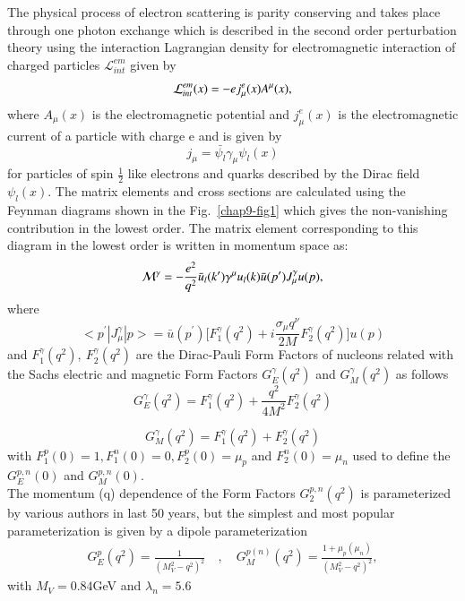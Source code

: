 The physical process of electron scattering is parity conserving and takes place through one photon exchange which is described in the second order perturbation theory using the interaction Lagrangian density for electromagnetic interaction  of charged particles $\mathcal{L}_{int}^{em}$  given by 
\begin{equation}
{\cal L}_{int}^{em}(x) = -e j_{\mu}^{e}(x)A^{\mu}(x),\label{chap9-eq1}
\end{equation}
where $A_\mu(x)$ is the electromagnetic potential and $j_\mu^e(x)$ is the electromagnetic current of a particle with charge e and is given by 
\begin{equation}
j_\mu =\bar{\psi_l}\gamma_\mu \psi_l(x) \label{chap9-eq2}
\end{equation}
for particles of spin $\frac{1}{2}$ like electrons and quarks described by the Dirac field $\psi_{l}(x)$. The matrix elements and cross sections are calculated using the Feynman diagrams shown in the Fig.~\ref{chap9-fig1} which gives the non-vanishing contribution in the lowest order. The matrix element corresponding to this diagram in the lowest order is written in momentum
space as:
\begin{equation}
{\cal M}^{\gamma} = -\frac{e^2}{q^2}\bar{u}_l(k')\gamma^\mu u_l(k) \bar{u}(p^\prime)J_\mu^\gamma u(p), \label{chap9-eq3}
\end{equation}
where 
\begin{equation}
<p^\prime|J_\mu^\gamma|p>= \bar{u}(p^\prime)\big[F_1^{\gamma}(q^2)+i\frac{\sigma_\mu q^\nu}{2M}F_2^{\gamma}(q^2)\big]u(p) \label{chap9-eq4} 
\end{equation}
and $F_1^\gamma(q^2),~ F_2^\gamma(q^2) $ are the Dirac-Pauli Form Factors of nucleons related with the Sachs electric and magnetic Form Factors $G_E^\gamma(q^2)$ and $G_M^\gamma(q^2)$  as follows
\begin{equation}
G_E^\gamma(q^2) = F_1^\gamma(q^2)+\frac{q^2}{4M^2}F^\gamma_2(q^2) \label{chap9-eq5}
\end{equation}
  
\begin{equation}
G_M^\gamma(q^2) = F_1^\gamma(q^2)+F_2^\gamma(q^2) \label{chap9-eq6}
\end{equation}
with $F_1^p(0)=1, F_1^n(0)=0, F_2^p(0)=\mu_p$ and $F_2^n(0)=\mu_n$ used to define the $G_E^{p,n}(0)$ and $G_M^{p,n}(0)$. \\
The momentum (q) dependence of the Form Factors $G_2^{p,n}(q^2)$ is parameterized by various authors in last 50 years, but the simplest and most popular parameterization is given by a dipole parameterization 
\begin{align}
G_E^p(q^2)=\frac{1}{(M_{V}^2 - q^2 )^2}  \quad ,  \quad 
G_M^{p(n)}(q^2)=\frac{1+\mu_p(\mu_n)}{(M_{V}^2 - q^2)^2} , \label{chap9-eq7}
\end{align} 
\noindent
with $M_V= 0.84$GeV and $\lambda_n=5.6$
   
